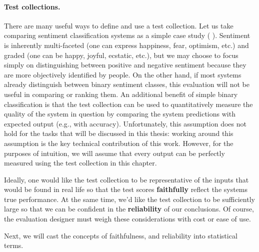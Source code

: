 \paragraph{Test collections.}
There are many useful ways to define and use a test collection.
Let us take comparing sentiment classification systems as a simple case study ( ).
Sentiment is inherently multi-faceted (one can express happiness, fear, optimism, etc.) and graded (one can be happy, joyful, ecstatic, etc.), but we may choose to focus simply on distinguishing between positive and negative sentiment because they are more objectively identified by people.
On the other hand, if most systems already distinguish between binary sentiment classes, this evaluation will not be useful in comparing or ranking them.
An additional benefit of simple binary classification is that the test collection can be used to quantitatively measure the quality of the system in question by comparing the system predictions with expected output (e.g., with accuracy).
Unfortunately, this assumption does not hold for the tasks that will be discussed in this thesis: working around this assumption is the key technical contribution of this work. 
However, for the purposes of intuition, we will assume that every output can be perfectly measured  using the test collection in this chapter.

Ideally, one would like the test collection to be representative of the inputs that would be found in real life so that the test scores \textbf{faithfully} reflect the systems true performance.
At the same time, we'd like the test collection to be sufficiently large so that we can be confident in the \textbf{reliability} of our conclusions.
Of course, the evaluation designer must weigh these considerations with cost or ease of use.

Next, we will cast the concepts of faithfulness, and reliability into statistical terms.

